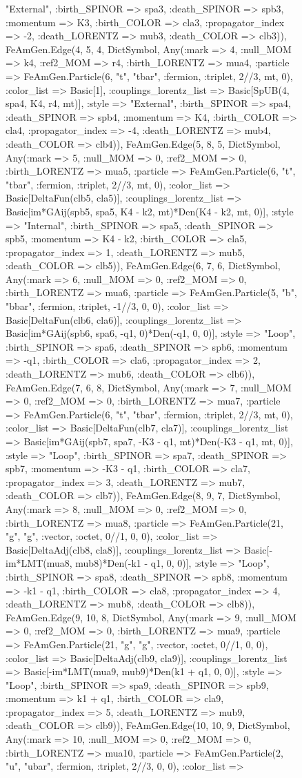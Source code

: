 \documentclass{revtex4}
\begin{document}
\begin{figure}[!htb]
\begin{center}
{"External", :birth_SPINOR => spa3, :death_SPINOR => spb3, :momentum => K3, :birth_COLOR => cla3, :propagator_index => -2, :death_LORENTZ => mub3, :death_COLOR => clb3)), FeAmGen.Edge(4, 5, 4, Dict{Symbol, Any}(:mark => 4, :null_MOM => k4, :ref2_MOM => r4, :birth_LORENTZ => mua4, :particle => FeAmGen.Particle(6, "t", "tbar", :fermion, :triplet, 2//3, mt, 0), :color_list => Basic[1], :couplings_lorentz_list => Basic[SpUB(4, spa4, K4, r4, mt)], :style => "External", :birth_SPINOR => spa4, :death_SPINOR => spb4, :momentum => K4, :birth_COLOR => cla4, :propagator_index => -4, :death_LORENTZ => mub4, :death_COLOR => clb4)), FeAmGen.Edge(5, 8, 5, Dict{Symbol, Any}(:mark => 5, :null_MOM => 0, :ref2_MOM => 0, :birth_LORENTZ => mua5, :particle => FeAmGen.Particle(6, "t", "tbar", :fermion, :triplet, 2//3, mt, 0), :color_list => Basic[DeltaFun(clb5, cla5)], :couplings_lorentz_list => Basic[im*GAij(spb5, spa5, K4 - k2, mt)*Den(K4 - k2, mt, 0)], :style => "Internal", :birth_SPINOR => spa5, :death_SPINOR => spb5, :momentum => K4 - k2, :birth_COLOR => cla5, :propagator_index => 1, :death_LORENTZ => mub5, :death_COLOR => clb5)), FeAmGen.Edge(6, 7, 6, Dict{Symbol, Any}(:mark => 6, :null_MOM => 0, :ref2_MOM => 0, :birth_LORENTZ => mua6, :particle => FeAmGen.Particle(5, "b", "bbar", :fermion, :triplet, -1//3, 0, 0), :color_list => Basic[DeltaFun(clb6, cla6)], :couplings_lorentz_list => Basic[im*GAij(spb6, spa6, -q1, 0)*Den(-q1, 0, 0)], :style => "Loop", :birth_SPINOR => spa6, :death_SPINOR => spb6, :momentum => -q1, :birth_COLOR => cla6, :propagator_index => 2, :death_LORENTZ => mub6, :death_COLOR => clb6)), FeAmGen.Edge(7, 6, 8, Dict{Symbol, Any}(:mark => 7, :null_MOM => 0, :ref2_MOM => 0, :birth_LORENTZ => mua7, :particle => FeAmGen.Particle(6, "t", "tbar", :fermion, :triplet, 2//3, mt, 0), :color_list => Basic[DeltaFun(clb7, cla7)], :couplings_lorentz_list => Basic[im*GAij(spb7, spa7, -K3 - q1, mt)*Den(-K3 - q1, mt, 0)], :style => "Loop", :birth_SPINOR => spa7, :death_SPINOR => spb7, :momentum => -K3 - q1, :birth_COLOR => cla7, :propagator_index => 3, :death_LORENTZ => mub7, :death_COLOR => clb7)), FeAmGen.Edge(8, 9, 7, Dict{Symbol, Any}(:mark => 8, :null_MOM => 0, :ref2_MOM => 0, :birth_LORENTZ => mua8, :particle => FeAmGen.Particle(21, "g", "g", :vector, :octet, 0//1, 0, 0), :color_list => Basic[DeltaAdj(clb8, cla8)], :couplings_lorentz_list => Basic[-im*LMT(mua8, mub8)*Den(-k1 - q1, 0, 0)], :style => "Loop", :birth_SPINOR => spa8, :death_SPINOR => spb8, :momentum => -k1 - q1, :birth_COLOR => cla8, :propagator_index => 4, :death_LORENTZ => mub8, :death_COLOR => clb8)), FeAmGen.Edge(9, 10, 8, Dict{Symbol, Any}(:mark => 9, :null_MOM => 0, :ref2_MOM => 0, :birth_LORENTZ => mua9, :particle => FeAmGen.Particle(21, "g", "g", :vector, :octet, 0//1, 0, 0), :color_list => Basic[DeltaAdj(clb9, cla9)], :couplings_lorentz_list => Basic[-im*LMT(mua9, mub9)*Den(k1 + q1, 0, 0)], :style => "Loop", :birth_SPINOR => spa9, :death_SPINOR => spb9, :momentum => k1 + q1, :birth_COLOR => cla9, :propagator_index => 5, :death_LORENTZ => mub9, :death_COLOR => clb9)), FeAmGen.Edge(10, 10, 9, Dict{Symbol, Any}(:mark => 10, :null_MOM => 0, :ref2_MOM => 0, :birth_LORENTZ => mua10, :particle => FeAmGen.Particle(2, "u", "ubar", :fermion, :triplet, 2//3, 0, 0), :color_list => }
\end{center}
\end{figure}
\end{document}
